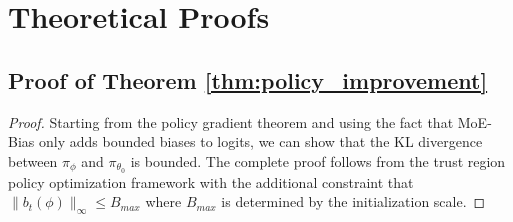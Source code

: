 \documentclass{article}
\begin{document}
\section{Theoretical Proofs}
\label{sec:appendix_theory}

\subsection{Proof of Theorem \ref{thm:policy_improvement}}

\begin{proof}
Starting from the policy gradient theorem and using the fact that MoE-Bias only adds bounded biases to logits, we can show that the KL divergence between $\pi_\phi$ and $\pi_{\theta_0}$ is bounded. The complete proof follows from the trust region policy optimization framework with the additional constraint that $\|b_t(\phi)\|_\infty \leq B_{max}$ where $B_{max}$ is determined by the initialization scale.
\end{proof}
\end{document}
